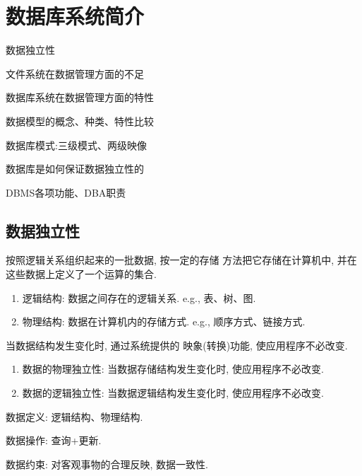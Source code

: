 \chapter{数据库系统简介}

\begin{introduction}[期末考试提纲]
    \item 数据独立性
    \item 文件系统在数据管理方面的不足
    \item 数据库系统在数据管理方面的特性
    \item 数据模型的概念、种类、特性比较
    \item 数据库模式:三级模式、两级映像

    \item 数据库是如何保证数据独立性的
    \item DBMS各项功能、DBA职责
\end{introduction}

\section{数据独立性}

\begin{definition}[数据结构]
按照逻辑关系组织起来的一批数据, 按一定的存储
方法把它存储在计算机中,
并在这些数据上定义了一个运算的集合.

\begin{enumerate}
    \item 逻辑结构: 数据之间存在的逻辑关系. e.g., 表、树、图.
    \item 物理结构: 数据在计算机内的存储方式. e.g., 顺序方式、链接方式.
\end{enumerate}
\end{definition}

\begin{definition}[数据独立性]
当数据结构发生变化时, 通过系统提供的
映象(转换)功能, 使应用程序不必改变.

\begin{enumerate}
    \item 数据的物理独立性: 当数据存储结构发生变化时, 使应用程序不必改变.
    \item 数据的逻辑独立性: 当数据逻辑结构发生变化时, 使应用程序不必改变.
\end{enumerate}
\end{definition}


数据定义: 逻辑结构、物理结构.

数据操作: 查询+更新.

数据约束: 对客观事物的合理反映, 数据一致性.

